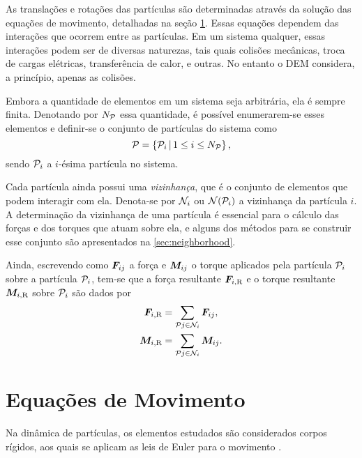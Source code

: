 As translações e rotações das partículas são determinadas através da solução das equações de movimento, detalhadas na seção \ref{sec:equations_of_motion}. Essas equações dependem das interações que ocorrem entre as partículas. Em um sistema qualquer, essas interações podem ser de diversas naturezas, tais quais colisões mecânicas, troca de cargas elétricas, transferência de calor, e outras. No entanto o DEM considera, a princípio, apenas as colisões.

Embora a quantidade de elementos em um sistema seja arbitrária, ela é sempre finita. Denotando por \(\numberOfParticles\) essa quantidade, é possível enumerarem-se esses elementos e definir-se o conjunto de partículas do sistema como
\begin{equation*}
	\particleSet = \left\lbrace\iparticle{i} \suchThat 1\leq i\leq\numberOfParticles\right\rbrace,
\end{equation*}
sendo \(\iparticle{i}\) a \(i\)-ésima partícula no sistema.

Cada partícula ainda possui uma \textit{vizinhança}, que é o conjunto de elementos que podem interagir com ela. Denota-se por \(\ineighborhood{i}\) ou \(\neighborhoodOf{\iparticle{i}}\) a vizinhança da partícula \(i\). A determinação da vizinhança de uma partícula é essencial para o cálculo das forças e dos torques que atuam sobre ela, e alguns dos métodos para se construir esse conjunto são apresentados na \autoref{sec:neighborhood}.

Ainda, escrevendo como \(\fromTo{\force}{j}{i}\) a força e \(\fromTo{\torque}{j}{i}\) o torque aplicados pela partícula \(\iparticle{j}\) sobre a partícula \(\iparticle{i}\), tem-se que a força resultante \(\iresultingForce{i}\) e o torque resultante \(\iresultingTorque{i}\) sobre \(\iparticle{i}\) são dados por
\begin{gather*}
	\iresultingForce{i} = \sum_{\particle{j}\in\ineighborhood{i}}\fromTo{\force}{j}{i}, \\
	\iresultingTorque{i} = \sum_{\particle{j}\in\ineighborhood{i}}\fromTo{\torque}{j}{i}.
\end{gather*}

\section{Equações de Movimento} \label{sec:equations_of_motion}

Na dinâmica de partículas, os elementos estudados são considerados corpos rígidos, aos quais se aplicam as leis de Euler para o movimento \cite{bib:sampaio, bib:dynamics_of_multibody_systems}.

